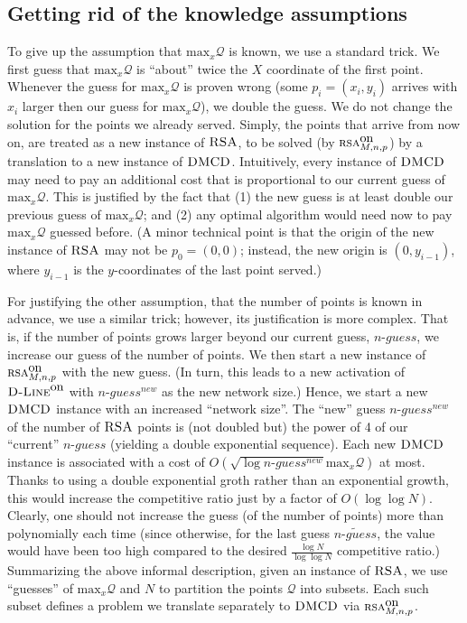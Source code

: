 \documentclass[11pt]{article}
\newcommand{\DMCD}{\mbox{\sc DMCD}}
\newcommand{\RSA}{\mbox{\sc RSA}}
\newcommand{\calQ}{\mathcal{Q}}
\newcommand{\onRSAmnp}[0]{\mbox{\sc rsa}^{\mbox{\upshape on}}_{\MM,\nn,p}}
\newcommand{\xmaxQ}[0]{\mbox{max}_x\calQ}
\newcommand{\MM}[0]{M}
\newcommand{\nn}{n}
\newcommand{\Dlineon}[0]{\mbox{{\sc D-Line}}^{\mbox{\upshape on}}}
\newcommand{\loglogratio}[1]{\frac{\log #1}{\log\log #1}}
\newcommand{\nguess}[0]{n\mbox{-}guess}
\begin{document}
\subsection{Getting rid of the {knowledge} assumptions}
\label{subsec: onRSA}

To give up the assumption that $\xmaxQ$ is known, we use a standard trick.
We first guess that $\xmaxQ$ is
``about'' twice the $X$ coordinate of the first point.
Whenever the guess for $\xmaxQ$ is proven wrong (some $p_i=(x_i,y_i)$ arrives with $x_i$ larger then our guess for $\xmaxQ$),
we double the guess.
We do not change the solution for the points we already served.
Simply, the points that arrive from now on, are treated as a new instance of $\RSA$, to be solved (by $\onRSAmnp$) by a translation to a new instance of $\DMCD$.
Intuitively, every instance of $\DMCD$ may need to pay an additional cost
that is proportional to our current guess of $\xmaxQ$.
This is justified by the fact that
(1) the new guess is at least double our previous guess of $\xmaxQ$;
and (2) any optimal algorithm would need now to pay $\xmaxQ$ guessed before.
(A minor technical point is that the origin of the new instance of $\RSA$ may not be
$p_0=(0,0)$;
instead, the new origin is $(0,y_{i-1})$, where $y_{i-1}$ is the $y$-coordinates of the last point served.)



For justifying the other assumption, that the number of points is known in advance,
we use a similar trick; however, its justification is more complex.
That is, if the number of points grows larger beyond our current guess, $\nguess$,
we increase our guess of the number of points.
We then start a new instance of $\onRSAmnp$ with the new guess.
(In turn, this leads to a new activation of $\Dlineon$ with $\nguess^{new}$ as the new network size.)
Hence, we start a new $\DMCD$ instance with an increased ``network size''.
The ``new'' guess $\nguess^{new}$ of the number of $\RSA$ points is (not doubled but) the
power of 4 of our ``current'' $\nguess$ (yielding a double exponential sequence).
Each new $\DMCD$ instance  is associated with a cost of $O(\sqrt{\log{\nguess^{new}}}\xmaxQ)$ at most.
Thanks to using a double exponential groth rather than an exponential growth, this would increase the competitive ratio just by a factor of $O(\log\log N)$.
Clearly, one should not increase the guess (of the number of points) more than polynomially each time
(since otherwise, for the last guess $\widetilde{\nguess}$, the value would have been too high compared to the desired $\loglogratio{N}$ competitive ratio.)
Summarizing the above informal description, given an instance of $\RSA$, we use ``guesses'' of $\xmaxQ$ and $N$
to partition the points $\calQ$ into subsets.
Each such subset defines a problem we translate separately to $\DMCD$ via $\onRSAmnp$.
\end{document}
